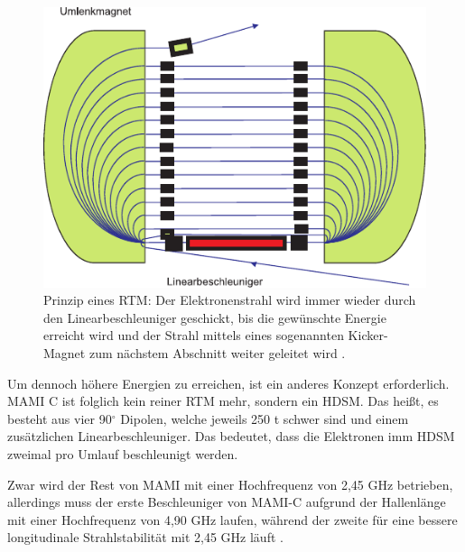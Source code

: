 \documentclass[a4paper,11pt,oneside,final,german,openbib,pdftex]{scrbook}
\begin{document}
{\begin{figure}[h!]
	\begin{center}
	\includegraphics{RTM}	
	\caption[Prinzip eines RTM]{Prinzip eines RTM: Der Elektronenstrahl wird immer wieder durch den Linearbeschleuniger geschickt, bis die gew\"unschte Energie erreicht wird und der Strahl mittels eines sogenannten Kicker-Magnet zum n\"achstem Abschnitt weiter geleitet wird \cite{KPh07}. }
	\label{fig.RTM}
\end{center}
\end{figure}

Um dennoch höhere Energien zu erreichen, ist ein anderes Konzept erforderlich. MAMI C ist folglich kein reiner RTM mehr, sondern ein HDSM. Das hei{\ss}t, es besteht aus vier 90$^{\circ}$ Dipolen, welche jeweils 250 t schwer sind und einem zus\"atzlichen Linearbeschleuniger. 
Das bedeutet, dass die Elektronen imm HDSM zweimal pro Umlauf beschleunigt werden.

Zwar wird der Rest von MAMI mit einer Hochfrequenz von 2,45 GHz betrieben, allerdings muss der erste Beschleuniger von MAMI-C aufgrund der Hallenl\"ange mit einer Hochfrequenz von 4,90 GHz laufen, w\"ahrend der zweite f\"ur eine bessere longitudinale Strahlstabilit\"at mit 2,45 GHz l\"auft \cite{Ca10}.

\begin{table}[h!]
\centering



\end{table}}
\end{document}
